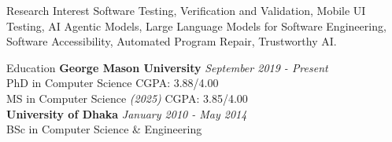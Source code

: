 \documentclass{resume} %
\begin{document}
\begin{rSection}{Research Interest}
Software Testing, Verification and Validation, Mobile UI Testing, AI Agentic Models, Large Language Models for Software Engineering, Software Accessibility, Automated Program Repair, Trustworthy AI.
\end{rSection}

\begin{rSection}{Education}
{\bf George Mason University} \hfill {\em September 2019 - Present} \\
PhD in Computer Science\hfill { CGPA: 3.88/4.00}
\\MS in Computer Science {\em (2025)}\hfill { CGPA: 3.85/4.00}
\\{\bf University of Dhaka} \hfill {\em January 2010 - May 2014} \\
BSc in Computer Science \& Engineering
\end{rSection}
\end{document}
